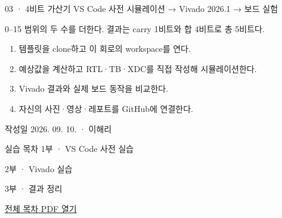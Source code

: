 
\renewcommand{\labonehome}{\hyperlink{modern-03-contents}{\contentsbutton}}
\renewcommand{\legacySource}[1]{}
\providecommand{\terminalbox}[1]{\par\vspace{0.15cm}{\setlength{\fboxsep}{7pt}\colorbox{black}{\parbox{\dimexpr\textwidth-14pt\relax}{\color{white}\ttfamily\fontsize{7}{9}\selectfont #1}}}\par\vspace{0.15cm}}

\begingroup
\renewcommand{\small}{\fontsize{9}{11}\selectfont}
\begin{frame}{03 · 4비트 가산기}\relax
\small
VS Code 사전 시뮬레이션 → Vivado 2026.1 → 보드 실험\par\vspace{0.22cm}0–15 범위의 두 수를 더한다. 결과는 carry 1비트와 합 4비트로 총 5비트다.\par\begin{enumerate}\setlength{\itemsep}{0.22cm}
\item 템플릿을 clone하고 이 회로의 workspace를 연다.
\item 예상값을 계산하고 RTL·TB·XDC를 직접 작성해 시뮬레이션한다.
\item Vivado 결과와 실제 보드 동작을 비교한다.
\item 자신의 사진·영상·레포트를 GitHub에 연결한다.
\end{enumerate}
작성일 2026. 09. 10. · 이해리\par
\end{frame}

\begin{frame}[label=modern-03-contents]{실습 목차}\relax
\small
1부 · VS Code 사전 실습\par{}\par\vspace{0.2cm}
\par\vspace{0.4cm}
2부 · Vivado 실습\par{}\par\vspace{0.4cm}
3부 · 결과 정리\par{}\par\vspace{0.35cm}
\href{04.LAB1_00_CONTENTS.pdf}{전체 목차 PDF 열기}
\end{frame}

